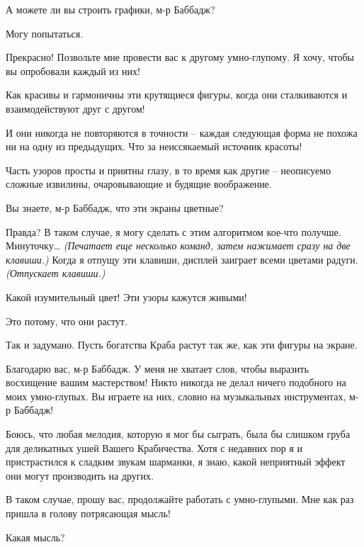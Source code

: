 \documentclass[../main.tex]{subfiles}
\begin{document}
\begin{dialogue}
 А можете ли вы строить графики, м-р Баббадж?

 Могу попытаться.

 Прекрасно! Позвольте мне провести вас к другому умно-глупому. Я хочу, чтобы вы опробовали каждый из них!


 Как красивы и гармоничны эти крутящиеся фигуры, когда они сталкиваются и взаимодействуют друг с другом!

 И они никогда не повторяются в точности \--- каждая следующая форма не похожа ни на одну из предыдущих. Что за неиссякаемый источник красоты!

 Часть узоров просты и приятны глазу, в то время как другие \--- неописуемо сложные извилины, очаровывающие и будящие воображение.

 Вы знаете, м-р Баббадж, что эти экраны цветные?

 Правда? В таком случае, я могу сделать с этим алгоритмом кое-что получше. Минуточку\ldots{} \emph{(Печатает еще несколько команд, затем нажимает сразу на две клавиши.)} Когда я отпущу эти клавиши, дисплей заиграет всеми цветами радуги. \emph{(Отпускает клавиши.)}

 Какой изумительный цвет! Эти узоры кажутся живыми!

 Это потому, что они растут.

 Так и задумано. Пусть богатства Краба растут так же, как эти фигуры на экране.

 Благодарю вас, м-р Баббадж. У меня не хватает слов, чтобы выразить восхищение вашим мастерством! Никто никогда не делал ничего подобного на моих умно-глупых. Вы играете на них, словно на музыкальных инструментах, м-р Баббадж!

 Боюсь, что любая мелодия, которую я мог бы сыграть, была бы слишком груба для деликатных ушей Вашего Крабичества. Хотя с недавних пор я и пристрастился к сладким звукам шарманки, я знаю, какой неприятный эффект они могут производить на других.

 В таком случае, прошу вас, продолжайте работать с умно-глупыми. Мне как раз пришла в голову потрясающая мысль!

 Какая мысль?


\end{dialogue}
\end{document}
